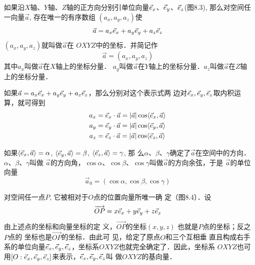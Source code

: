 \begin{figure}[htp]
    \centering
{}
    \caption{}
\end{figure}


如果沿$X$轴、$Y$轴、$Z$轴的正方向分别引单位向量$\vec{e}_x$、$\vec{e}_y$、$\vec{e}_z$(图8.3), 那么对空间任一向量$\vec{a}$, 存在唯一的有序数组
$(a_x,a_y,a_z)$使
\[\vec{a}=a_x\vec{e}_x+a_y\vec{e}_y+a_z\vec{e}_z\]
$(a_x,a_y,a_z)$就叫做$\vec{a}$在
$OXYZ$中的坐标．并简记作
\[\vec{a}=(a_x,a_y,a_z)\]
其中$a_x$叫做$\vec{a}$在$X$轴上的坐标分量．
$a_y$叫做$\vec{a}$在$Y$轴上的坐标分量．$a_z$叫做$\vec{a}$在$Z$轴上的坐标分量．

如果$\vec{a}=a_x\vec{e}_x+a_y\vec{e}_y+a_z\vec{e}_z$，那么分别对这个表示式两
边对$\vec{e}_x,\vec{e}_y,\vec{e}_z$取内积运算，就可得到
\[\begin{split}
    a_x&=\vec{e}_x\cdot \vec{a}=|\vec{a}|\cos\langle \vec{e}_x,\vec{a} \rangle \\
    a_y&=\vec{e}_y\cdot \vec{a}=|\vec{a}|\cos\langle \vec{e}_y,\vec{a} \rangle \\
    a_z&=\vec{e}_z\cdot \vec{a}=|\vec{a}|\cos\langle \vec{e}_z,\vec{a} \rangle \\
\end{split}\]

如果$\langle \vec{e}_x,\vec{a} \rangle=\alpha$, $\langle \vec{e}_y,\vec{a} \rangle=\beta$, $\langle \vec{e}_z,\vec{a} \rangle=\gamma$, 那
么$\alpha$、$\beta$、$\gamma$确定了$\vec{a}$在空间中的方向．$\alpha$、$\beta$、$\gamma$叫做
$\vec{a}$的方向角，$\cos\alpha$、$\cos\beta$、$\cos\gamma$叫做$\vec{a}$的方向余弦，于是
$\vec{a}$的单位向量
\[\vec{a}_0=(\cos\alpha, \cos\beta, \cos\gamma)\]

对空间任一点$P$, 它被相对于$O$点的位置向量所唯一确
定（图8.4）．设
\[\overrightarrow{OP}=x\vec{e}_x+y\vec{e}_y+z\vec{e}_z\]
由上述点的坐标和向量坐标的定
义，$\Vec{OP}$的坐标$(x,y,z)$
也就是$P$点的坐标；反之$P$点的
坐标也是$\Vec{OP}$的坐标．由此可
见，给定了原点$O$和三个互相垂
直且构成右手系的单位向量$\vec{e}_x,\vec{e}_y,\vec{e}_z$，坐标系$OXYZ$也就完全确定了．因此，坐标系
$OXYZ$也可用$[O:\vec{e}_x,\vec{e}_y,\vec{e}_z]$来表示，$\vec{e}_x,\vec{e}_y,\vec{e}_z$叫
做$OXYZ$的基向量．

